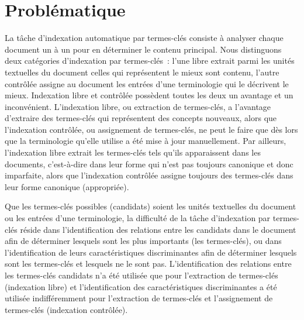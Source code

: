 
  \section{Problématique}
  \label{sec:main-introduction-problem_statement}
    La tâche d'indexation automatique par termes-clés consiste à analyser chaque
    document un à un pour en déterminer le contenu principal. Nous distinguons
    deux catégories d'indexation par termes-clés~: l'une libre extrait parmi les
    unités textuelles du document celles qui représentent le mieux sont contenu,
    l'autre contrôlée assigne au document les entrées d'une terminologie qui le
    décrivent le mieux. Indexation libre et contrôlée possèdent toutes les deux
    un avantage et un inconvénient. L'indexation libre, ou extraction de
    termes-clés, a l'avantage d'extraire des termes-clés qui représentent des
    concepts nouveaux, alors que l'indexation contrôlée, ou assignement de
    termes-clés, ne peut le faire que dès lors que la terminologie qu'elle
    utilise a été mise à jour manuellement. Par ailleurs, l'indexation libre
    extrait les termes-clés tels qu'ils apparaissent dans les documents,
    c'est-à-dire dans leur forme qui n'est pas toujours canonique et donc
    imparfaite, alors que l'indexation contrôlée assigne toujours des
    termes-clés dans leur forme canonique (appropriée).
    
    Que les termes-clés possibles (candidats) soient les unités textuelles du
    document ou les entrées d'une terminologie, la difficulté de la tâche
    d'indexation par termes-clés réside dans l'identification des relations
    entre les candidats dans le document afin de déterminer lesquels sont les
    plus importants (les termes-clés), ou dans l'identification de leurs
    caractéristiques discriminantes afin de déterminer lesquels sont les
    termes-clés et lesquels ne le sont pas. L'identification des relations entre
    les termes-clés candidats n'a été utilisée que pour l'extraction de
    termes-clés (indexation libre) et l'identification des caractéristiques
    discriminantes a été utilisée indifféremment pour l'extraction de
    termes-clés et l'assignement de termes-clés (indexation contrôlée).


